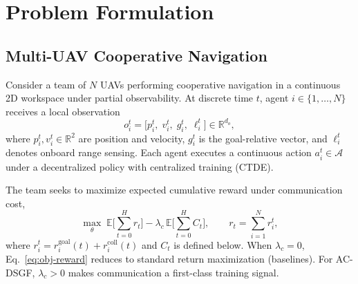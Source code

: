 
\section{Problem Formulation}
\label{sec:problem}

\subsection{Multi-UAV Cooperative Navigation}
Consider a team of $N$ UAVs performing cooperative navigation in a continuous
2D workspace under partial observability.
At discrete time $t$, agent $i\in\{1,\ldots,N\}$ receives a local observation
\begin{equation}
o_i^{t}
=
\bigl[
p_i^{t},\;
v_i^{t},\;
g_i^{t},\;
\ell_i^{t}
\bigr]
\in \mathbb{R}^{d_o},
\label{eq:obs}
\end{equation}
where $p_i^{t},v_i^{t}\in\mathbb{R}^{2}$ are position and velocity,
$g_i^{t}$ is the goal-relative vector, and $\ell_i^{t}$ denotes onboard
range sensing.
Each agent executes a continuous action $a_i^{t}\in\mathcal{A}$ under a
decentralized policy with centralized training (CTDE).

The team seeks to maximize expected cumulative reward under communication cost,
\begin{equation}
\max_{\theta}
\;
\mathbb{E}\!\Biggl[
\sum_{t=0}^{H}
r_t
\Biggr]
-
\lambda_c\,
\mathbb{E}\!\Biggl[
\sum_{t=0}^{H}
C_t
\Biggr],
\qquad
r_t=\sum_{i=1}^{N} r_i^{t},
\label{eq:obj-reward}
\end{equation}
where $r_i^{t}=r_i^{\mathrm{goal}}(t)+r_i^{\mathrm{coll}}(t)$ and $C_t$ is
defined below.
When $\lambda_c{=}0$, Eq.~\eqref{eq:obj-reward} reduces to standard return
maximization (baselines).
For AC-DSGF, $\lambda_c{>}0$ makes communication a first-class training signal.

